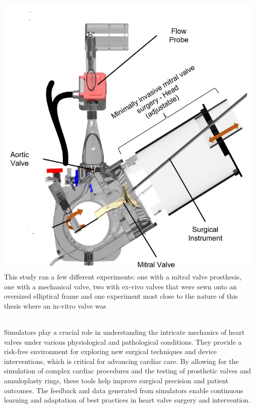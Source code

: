 \begin{itemize}
{              \includegraphics[width=\linewidth]{figures/karl1.jpg}
              \label{fig:k2}
          }
          This study ran a few different experiments: one with a mitral valve prosthesis, one with a mechanical valve, two with ex-vivo valves that were sewn onto an oversized elliptical frame and one experiment most close to the nature of this thesis where an in-vitro valve was
\end{itemize}
\\
Simulators play a crucial role in understanding the intricate mechanics of heart valves under various physiological and pathological conditions. They provide a risk-free environment for exploring new surgical techniques and device interventions, which is critical for advancing cardiac care. By allowing for the simulation of complex cardiac procedures and the testing of prosthetic valves and annuloplasty rings, these tools help improve surgical precision and patient outcomes. The feedback and data generated from simulators enable continuous learning and adaptation of best practices in heart valve surgery and intervention.

